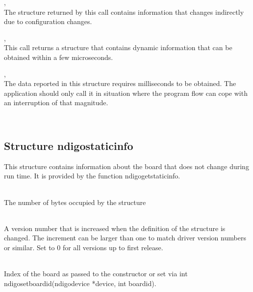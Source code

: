            , \\
            The structure returned by this call contains information that changes indirectly due to configuration changes.\par

            , \\
            This call returns a structure that contains dynamic information that can be obtained within a few microseconds.\par

            , \\
            The data reported in this structure requires milliseconds to be obtained. The application should only call it in situation where the program flow can cope with an interruption of that magnitude.

        \\
        \subsection{Structure ndigo\tu static\tu info}

            This structure contains information about the board that does not change during run time. It is provided by the function \textsf{ndigo\tu get\tu static\tu info}.\par

            \\
            The number of bytes occupied by the structure\par

            \\
            A version number that is increased when the definition of the structure is changed. The increment can be larger than one to match driver version numbers or similar. Set to 0 for all versions up to first release.\par

            \\
            Index of the board as passed to the constructor or set via \textsf{int ndigo\tu set\tu board\tu id(ndigo\tu device *device, int board\tu id)}.\par

